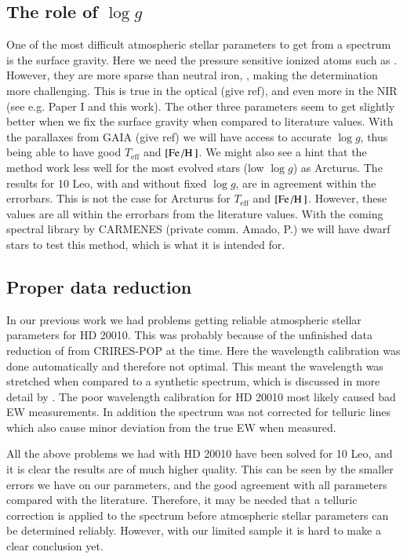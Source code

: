 \documentclass{aa}
\begin{document}
\subsection{The role of $\log g$}

One of the most difficult atmospheric stellar parameters to get from a spectrum
is the surface gravity. Here we need the pressure sensitive ionized atoms such
as . However, they are more sparse than neutral iron, ,
making the determination more challenging. This is true in the optical (give
ref), and even more in the NIR (see e.g. Paper I and this work). The other three
parameters seem to get slightly better when we fix the surface gravity when
compared to literature values. With the parallaxes from GAIA (give ref) we will
have access to accurate $\log g$, thus being able to have good $T_\mathrm{eff}$
and $[\ion{Fe}/\ion{H}]$. We might also see a hint that the method work less
well for the most evolved stars (low $\log g$) as Arcturus. The results for 10
Leo, with and without fixed $\log g$, are in agreement within the errorbars.
This is not the case for Arcturus for $T_\mathrm{eff}$ and $[\ion{Fe}/\ion{H}]$.
However, these values are all within the errorbars from the literature values.
With the coming spectral library by CARMENES (private comm. Amado, P.) we will
have dwarf stars to test this method, which is what it is intended for.


\subsection{Proper data reduction}

In our previous work we had problems getting reliable atmospheric stellar
parameters for HD 20010. This was probably because of the unfinished data
reduction of from CRIRES-POP at the time. Here the wavelength calibration was
done automatically and therefore not optimal. This meant the wavelength was
stretched when compared to a synthetic spectrum, which is discussed in more
detail by \citet{Nicholls2016}. The poor wavelength calibration for HD 20010
most likely caused bad EW measurements. In addition the spectrum was not
corrected for telluric lines which also cause minor deviation from the true EW
when measured.

All the above problems we had with HD 20010 have been solved for 10 Leo, and it
is clear the results are of much higher quality. This can be seen by the smaller
errors we have on our parameters, and the good agreement with all parameters
compared with the literature. Therefore, it may be needed that a telluric
correction is applied to the spectrum before atmospheric stellar parameters can
be determined reliably. However, with our limited sample it is hard to make a
clear conclusion yet.
\end{document}
